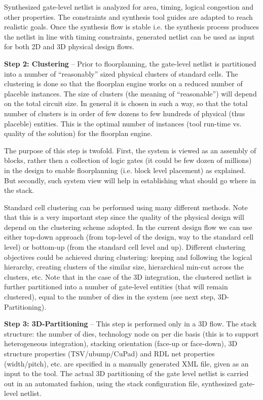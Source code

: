Synthesized gate-level netlist is analyzed for area, timing, logical congestion and other properties. The constraints and synthesis tool guides are adapted to reach realistic goals. Once the synthesis flow is stable i.e. the synthesis process produces the netlist in line with timing constraints, generated netlist can be used as input for both 2D and 3D physical design flows.

\textbf{Step 2: Clustering} – Prior to floorplanning, the gate-level netlist is partitioned into a number of  “reasonably” sized physical clusters of standard cells. The clustering is done so that the floorplan engine works on a reduced number of placeble instances. The size of clusters (the meaning of “reasonable”) will depend on the total circuit size. In general it is chosen in such a way, so that the total number of clusters is in order of few dozens to few hundreds of physical (thus placeble) entities. This is the optimal number of instances (tool run-time vs. quality of the solution) for the floorplan engine.

The purpose of this step is twofold. First, the system is viewed as an assembly of blocks, rather then a collection of logic gates (it could be few dozen of millions) in the design to enable floorplanning (i.e. block level placement) as explained. But secondly, such system view will help in establishing what should go where in the stack. 

Standard cell clustering can be performed using many different methods. Note that this is a very important step since the quality of the physical design will depend on the clustering scheme adopted. In the current design flow we can use either top-down approach (from top-level of the design, way to the standard cell level) or bottom-up (from the standard cell level and up). Different clustering objectives could be achieved during clustering: keeping and following the logical hierarchy, creating clusters of the similar size, hierarchical min-cut across the clusters, etc. Note that in the case of the 3D integration, the clustered netlist is further partitioned into a number of gate-level entities (that will remain clustered), equal to the number of dies in the system (see next step, 3D-Partitioning). 

\textbf{Step 3: 3D-Partitioning} – This step is performed only in a 3D flow. The stack structure: the number of dies, technology node on per die basis (this is to support heterogeneous integration), stacking orientation (face-up or face-down), 3D structure properties (TSV/ubump/CuPad) and RDL net properties (width/pitch), etc. are specified in a manually generated XML file, given as an input to the tool. The actual 3D partitioning of the gate level netlist is carried out in an automated fashion, using the stack configuration file, synthesized gate-level netlist. 

